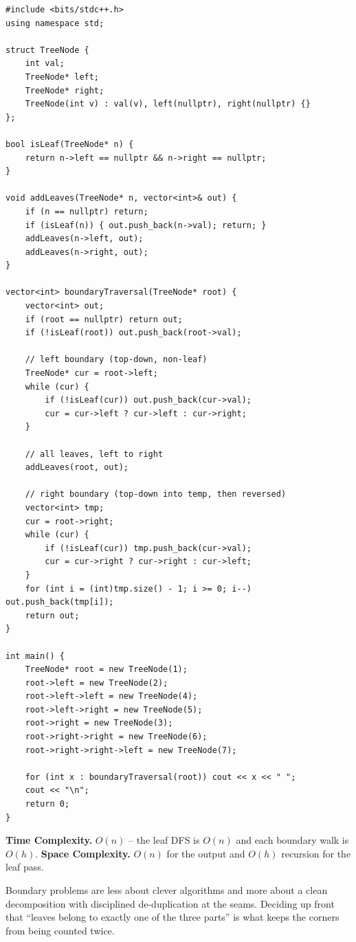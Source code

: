 \begin{lstlisting}
#include <bits/stdc++.h>
using namespace std;

struct TreeNode {
    int val;
    TreeNode* left;
    TreeNode* right;
    TreeNode(int v) : val(v), left(nullptr), right(nullptr) {}
};

bool isLeaf(TreeNode* n) {
    return n->left == nullptr && n->right == nullptr;
}

void addLeaves(TreeNode* n, vector<int>& out) {
    if (n == nullptr) return;
    if (isLeaf(n)) { out.push_back(n->val); return; }
    addLeaves(n->left, out);
    addLeaves(n->right, out);
}

vector<int> boundaryTraversal(TreeNode* root) {
    vector<int> out;
    if (root == nullptr) return out;
    if (!isLeaf(root)) out.push_back(root->val);

    // left boundary (top-down, non-leaf)
    TreeNode* cur = root->left;
    while (cur) {
        if (!isLeaf(cur)) out.push_back(cur->val);
        cur = cur->left ? cur->left : cur->right;
    }

    // all leaves, left to right
    addLeaves(root, out);

    // right boundary (top-down into temp, then reversed)
    vector<int> tmp;
    cur = root->right;
    while (cur) {
        if (!isLeaf(cur)) tmp.push_back(cur->val);
        cur = cur->right ? cur->right : cur->left;
    }
    for (int i = (int)tmp.size() - 1; i >= 0; i--) out.push_back(tmp[i]);
    return out;
}

int main() {
    TreeNode* root = new TreeNode(1);
    root->left = new TreeNode(2);
    root->left->left = new TreeNode(4);
    root->left->right = new TreeNode(5);
    root->right = new TreeNode(3);
    root->right->right = new TreeNode(6);
    root->right->right->left = new TreeNode(7);

    for (int x : boundaryTraversal(root)) cout << x << " ";
    cout << "\n";
    return 0;
}
\end{lstlisting}

\begin{complexitybox}
\textbf{Time Complexity.} $O(n)$ -- the leaf DFS is $O(n)$ and each
boundary walk is $O(h)$. \textbf{Space Complexity.} $O(n)$ for the output
and $O(h)$ recursion for the leaf pass.
\end{complexitybox}

\begin{takeawaybox}
Boundary problems are less about clever algorithms and more about a clean
decomposition with disciplined de-duplication at the seams. Deciding up
front that ``leaves belong to exactly one of the three parts'' is what
keeps the corners from being counted twice.
\end{takeawaybox}
